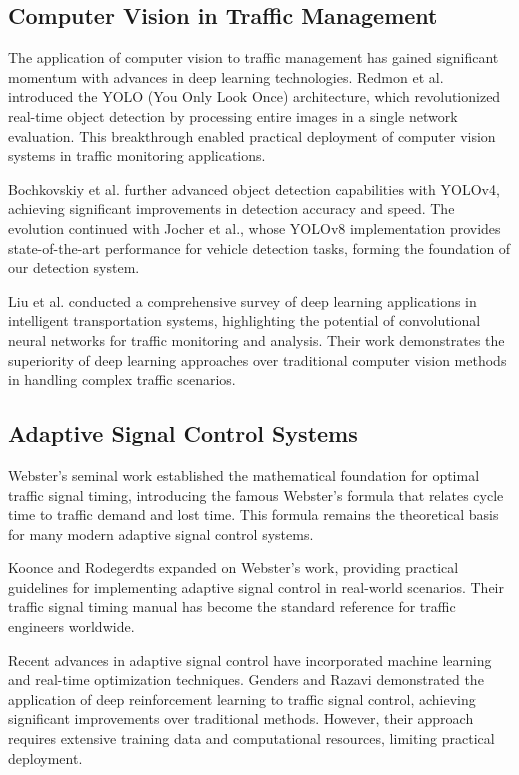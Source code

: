 \documentclass[conference]{IEEEtran}
\begin{document}
\subsection{Computer Vision in Traffic Management}

The application of computer vision to traffic management has gained significant momentum with advances in deep learning technologies. Redmon et al. introduced the YOLO (You Only Look Once) architecture, which revolutionized real-time object detection by processing entire images in a single network evaluation. This breakthrough enabled practical deployment of computer vision systems in traffic monitoring applications.

Bochkovskiy et al. further advanced object detection capabilities with YOLOv4, achieving significant improvements in detection accuracy and speed. The evolution continued with Jocher et al., whose YOLOv8 implementation provides state-of-the-art performance for vehicle detection tasks, forming the foundation of our detection system.

Liu et al. conducted a comprehensive survey of deep learning applications in intelligent transportation systems, highlighting the potential of convolutional neural networks for traffic monitoring and analysis. Their work demonstrates the superiority of deep learning approaches over traditional computer vision methods in handling complex traffic scenarios.

\subsection{Adaptive Signal Control Systems}

Webster's seminal work established the mathematical foundation for optimal traffic signal timing, introducing the famous Webster's formula that relates cycle time to traffic demand and lost time. This formula remains the theoretical basis for many modern adaptive signal control systems.

Koonce and Rodegerdts expanded on Webster's work, providing practical guidelines for implementing adaptive signal control in real-world scenarios. Their traffic signal timing manual has become the standard reference for traffic engineers worldwide.

Recent advances in adaptive signal control have incorporated machine learning and real-time optimization techniques. Genders and Razavi demonstrated the application of deep reinforcement learning to traffic signal control, achieving significant improvements over traditional methods. However, their approach requires extensive training data and computational resources, limiting practical deployment.
\end{document}
